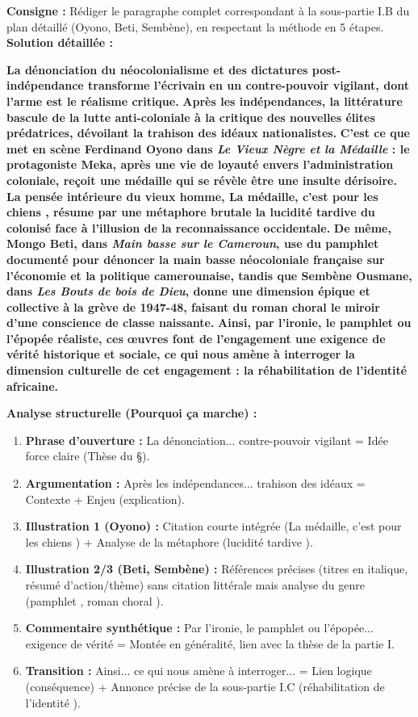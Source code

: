 \documentclass[11pt]{article}
\begin{document}
\begin{exoresolu}
\textbf{Consigne :} Rédiger le paragraphe complet correspondant à la sous-partie I.B du plan détaillé (Oyono, Beti, Sembène), en respectant la méthode en 5 étapes.
\tcblower
\textbf{Solution détaillée :}

\og \textbf{La dénonciation du néocolonialisme et des dictatures post-indépendance transforme l'écrivain en un contre-pouvoir vigilant, dont l'arme est le réalisme critique.} \textbf{Après les indépendances, la littérature bascule de la lutte anti-coloniale à la critique des nouvelles élites prédatrices, dévoilant la trahison des idéaux nationalistes.} \textbf{C'est ce que met en scène Ferdinand Oyono dans \emph{Le Vieux Nègre et la Médaille} : le protagoniste Meka, après une vie de loyauté envers l'administration coloniale, reçoit une médaille qui se révèle être une insulte dérisoire.} \textbf{La pensée intérieure du vieux homme, \og La médaille, c'est pour les chiens \fg, résume par une métaphore brutale la lucidité tardive du colonisé face à l'illusion de la reconnaissance occidentale.} \textbf{De même, Mongo Beti, dans \emph{Main basse sur le Cameroun}, use du pamphlet documenté pour dénoncer la \og main basse \fg néocoloniale française sur l'économie et la politique camerounaise, tandis que Sembène Ousmane, dans \emph{Les Bouts de bois de Dieu}, donne une dimension épique et collective à la grève de 1947-48, faisant du roman choral le miroir d'une conscience de classe naissante.} \textbf{Ainsi, par l'ironie, le pamphlet ou l'épopée réaliste, ces œuvres font de l'engagement une exigence de vérité historique et sociale, ce qui nous amène à interroger la dimension culturelle de cet engagement : la réhabilitation de l'identité africaine.} \fg

\textbf{Analyse structurelle (Pourquoi ça marche) :}
\begin{enumerate}
    \item \textbf{Phrase d'ouverture :} \og La dénonciation... contre-pouvoir vigilant \fg = Idée force claire (Thèse du §).
    \item \textbf{Argumentation :} \og Après les indépendances... trahison des idéaux \fg = Contexte + Enjeu (explication).
    \item \textbf{Illustration 1 (Oyono) :} Citation courte intégrée (\og La médaille, c'est pour les chiens \fg) + Analyse de la métaphore (\og lucidité tardive \fg).
    \item \textbf{Illustration 2/3 (Beti, Sembène) :} Références précises (titres en italique, résumé d'action/thème) sans citation littérale mais analyse du genre (\og pamphlet \fg, \og roman choral \fg).
    \item \textbf{Commentaire synthétique :} \og Par l'ironie, le pamphlet ou l'épopée... exigence de vérité \fg = Montée en généralité, lien avec la thèse de la partie I.
    \item \textbf{Transition :} \og Ainsi... ce qui nous amène à interroger... \fg = Lien logique (conséquence) + Annonce précise de la sous-partie I.C (\og réhabilitation de l'identité \fg).
\end{enumerate}
\end{exoresolu}
\end{document}
